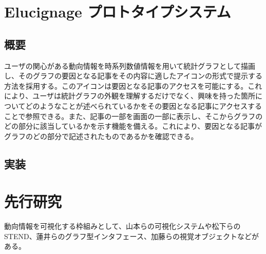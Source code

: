 \documentclass{matsushita-zemi}
\begin{document}
\section{Elucignage プロトタイプシステム}
\subsection{概要}
ユーザの関心がある動向情報を時系列数値情報を用いて統計グラフとして描画し、そのグラフの要因となる記事をその内容に適したアイコンの形式で提示する方法を採用する。このアイコンは要因となる記事のアクセスを可能にする。これにより、ユーザは統計グラフの外観を理解するだけでなく、興味を持った箇所についてどのようなことが述べられているかをその要因となる記事にアクセスすることで参照できる。また、記事の一部を画面の一部に表示し、そこからグラフのどの部分に該当しているかを示す機能を備える。これにより、要因となる記事がグラフのどの部分で記述されたものであるかを確認できる。
\subsection{実装}

\section{先行研究}
\label{relatedworks} 
動向情報を可視化する枠組みとして、山本らの可視化システム\cite{タグ付きコーパス}や松下らのSTEND\cite{STEND}、蓮井らのグラフ型インタフェース\cite{比較}、加藤らの視覚オブジェクト\cite{情報編纂研究会}などがある。
\end{document}
